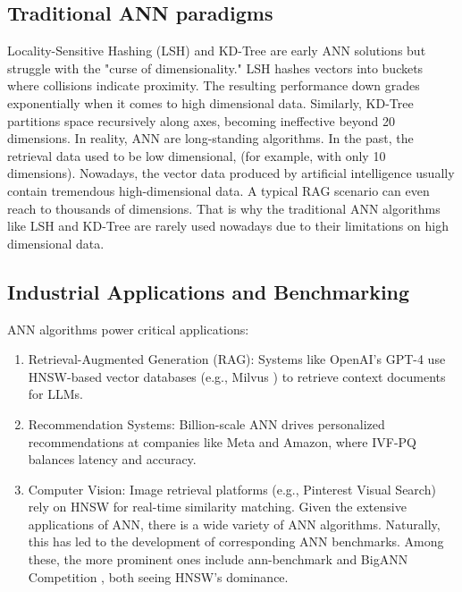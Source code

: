 \documentclass[sigconf, nonacm]{acmart}
\begin{document}
\subsection{Traditional ANN paradigms}
Locality-Sensitive Hashing (LSH)\cite{lsh} and KD-Tree\cite{kdtree} are early ANN solutions but struggle with the "curse of dimensionality." LSH hashes vectors into buckets where collisions indicate proximity. The resulting performance down grades exponentially when it comes to high dimensional data. Similarly, KD-Tree partitions space recursively along axes, becoming ineffective beyond 20 dimensions. 
In reality, ANN are long-standing algorithms.  In the past, the retrieval data used to be low dimensional, (for example, with only 10 dimensions).  Nowadays, the vector data produced by artificial intelligence usually contain tremendous high-dimensional data. A typical RAG scenario can even reach to thousands of dimensions.  That is why the traditional ANN algorithms like LSH and KD-Tree are rarely used nowadays due to their limitations on high dimensional data.

\subsection{Industrial Applications and Benchmarking}
ANN algorithms power critical applications:
\begin{enumerate}
    \item Retrieval-Augmented Generation (RAG): Systems like OpenAI’s GPT-4 use HNSW-based vector databases (e.g., Milvus \cite{milvus}) to retrieve context documents for LLMs.
    \item Recommendation Systems: Billion-scale ANN drives personalized recommendations at companies like Meta and Amazon, where IVF-PQ balances latency and accuracy.
    \item Computer Vision: Image retrieval platforms (e.g., Pinterest Visual Search\cite{pinterest}) rely on HNSW for real-time similarity matching.
Given the extensive applications of ANN, there is a wide variety of ANN algorithms. Naturally, this has led to the development of corresponding ANN benchmarks. Among these, the more prominent ones include ann-benchmark \cite{annbenchmark} and BigANN Competition \cite{bigann}, both seeing HNSW’s dominance.
\end{enumerate}
\end{document}
